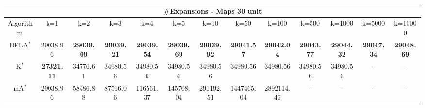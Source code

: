 \begin{tabular}{c|cccccccccccc}\toprule
\multicolumn{13}{c}{#Expansions - Maps 30 unit}\\ \midrule
Algorithm & k=1 & k=2 & k=3 & k=4 & k=5 & k=10 & k=50 & k=100 & k=500 & k=1000 & k=5000 & k=10000 \\ \midrule
BELA$^*$ & 29038.96 & \textbf{29039.09} & \textbf{29039.21} & \textbf{29039.54} & \textbf{29039.69} & \textbf{29039.92} & \textbf{29041.57} & \textbf{29042.04} & \textbf{29043.77} & \textbf{29044.32} & \textbf{29047.34} & \textbf{29048.69} \\
K$^*$ & \textbf{27321.11} & 34776.61 & 34980.56 & 34980.56 & 34980.56 & 34980.56 & 34980.56 & 34980.56 & 34980.56 & 34980.56 & -- & -- \\
mA$^*$ & 29038.96 & 58486.88 & 87516.06 & 116561.37 & 145708.04 & 291192.51 & 1447465.04 & 2892114.46 & -- & -- & -- & -- \\ \bottomrule 
\end{tabular}

